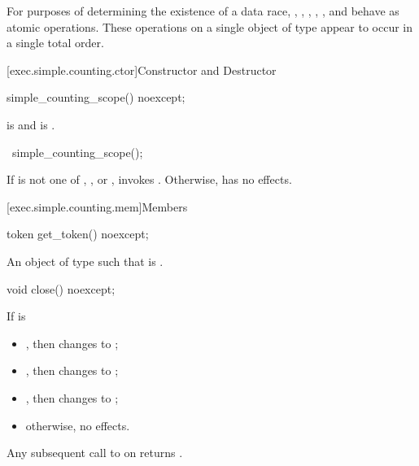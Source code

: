 \pnum
For purposes of determining the existence of a data race,
,
,
,
,
, and
behave as atomic operations.
These operations on a single object of
type  appear to occur in a single total order.

[exec.simple.counting.ctor]{Constructor and Destructor}

%
\begin{itemdecl}
simple_counting_scope() noexcept;
\end{itemdecl}

\begin{itemdescr}
\pnum
\ensures
{} is  and  is .
\end{itemdescr}

%
\begin{itemdecl}
~simple_counting_scope();
\end{itemdecl}

\begin{itemdescr}
\pnum
\effects
If  is not one of
, , or ,
invokes .
Otherwise, has no effects.
\end{itemdescr}

[exec.simple.counting.mem]{Members}

%
\begin{itemdecl}
token get_token() noexcept;
\end{itemdecl}

\begin{itemdescr}
\pnum
\returns
An object  of type  such that
 is .
\end{itemdescr}

%
\begin{itemdecl}
void close() noexcept;
\end{itemdecl}

\begin{itemdescr}
\pnum
\effects
If  is
\begin{itemize}
\item
{}, then changes  to ;
\item
{}, then changes  to ;
\item
{},
then changes  to ;
\item
otherwise, no effects.
\end{itemize}

\pnum
\ensures
Any subsequent call to  on 
returns .
\end{itemdescr}

